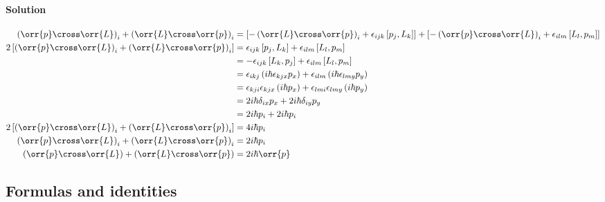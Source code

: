 \documentclass{article}
\begin{document}
{\begin{enumerate}
\begin{enumerate}
				\paragraph{Solution} \unboldmath
				\begin{equation*}
					\begin{split}
						\left( \orr{p} \cross \orr{L} \right)_i + \left( \orr{L} \cross \orr{p} \right)_i &= \left[ -\left( \orr{L} \cross \orr{p} \right)_i + \epsilon_{ijk} \left[ p_j , L_k \right] \right] + \left[ -\left( \orr{p} \cross \orr{L} \right)_i + \epsilon_{ilm} \left[ L_l , p_m \right] \right] \\
						2\left[ \left( \orr{p} \cross \orr{L} \right)_i + \left( \orr{L} \cross \orr{p} \right)_i \right] &= \epsilon_{ijk} \left[ p_j , L_k \right] + \epsilon_{ilm} \left[ L_l , p_m \right] \\
						&= -\epsilon_{ijk} \left[ L_k , p_j \right] + \epsilon_{ilm} \left[ L_l , p_m \right] \\
						&= \epsilon_{ikj} \left( i\hbar \epsilon_{kjx} p_x \right) + \epsilon_{ilm} \left( i\hbar \epsilon_{lmy} p_y \right) \\
						&= \epsilon_{kji} \epsilon_{kjx} \left( i\hbar p_x \right) + \epsilon_{lmi} \epsilon_{lmy} \left( i\hbar p_y \right) \\
						&= 2 i\hbar \delta_{ix} p_x + 2 i\hbar \delta_{iy} p_y \\
						&= 2 i\hbar p_i + 2 i\hbar p_i \\
						2\left[ \left( \orr{p} \cross \orr{L} \right)_i + \left( \orr{L} \cross \orr{p} \right)_i \right] &= 4 i\hbar p_i \\
						\left( \orr{p} \cross \orr{L} \right)_i + \left( \orr{L} \cross \orr{p} \right)_i &= 2 i\hbar p_i \\
						\left( \orr{p} \cross \orr{L} \right) + \left( \orr{L} \cross \orr{p} \right) &= 2 i\hbar \orr{p} \\
					\end{split}
				\end{equation*}
			\end{enumerate}
		\end{enumerate}
	\unboldmath
	\subsection*{Formulas and identities}
	
}
\end{document}
